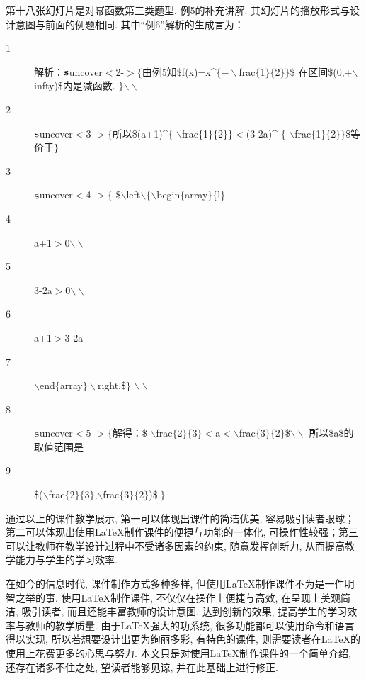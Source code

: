 第十八张幻灯片是对幂函数第三类题型, 例5的补充讲解. 其幻灯片的播放形式与设计意图与前面的例题相同. 其中“例6”解析的生成言为：
\begin{description}
	\item[1] 解析：${\mathbf s}$uncover$<$2-$>\{$由例5知\$f(x)=x\^{}$\{-\backslash$frac$\{$1$\}\{$2$\}\}$\$
	在区间\$(0,+$\backslash$infty)\$内是减函数. $\}$$\backslash\backslash$
	\item[2]${\mathbf s}$uncover$<$3-$>\{$所以\$(a+1)\^{}$\{$-$\backslash$frac$\{$1$\}\{$2$\}\}<$(3-2a)\^{}
	$\{$-$\backslash$frac$\{$1$\}\{$2$\}\}$\$等价于$\}$
	\item[3]${\mathbf s}$uncover$<$4-$>\{$ \$$\backslash$left$\backslash\{\backslash$begin$\{$array$\}\{$l$\}$
	\item[4]  a+1$>$0$\backslash\backslash$
	\item[5] 3-2a$>$0$\backslash\backslash$
	\item[6] a+1$>$3-2a
	\item[7] $\backslash$end$\{$array$\}\backslash$right.\$$\}$ $\backslash\backslash$
	\item[8]${\mathbf s}$uncover$<$5-$>\{$解得：\$
	$\backslash$frac$\{$2$\}\{$3$\}<$a$<\backslash$frac$\{$3$\}\{$2$\}$\$$\backslash\backslash$
	所以\$a\$的取值范围是
	\item[9] \$($\backslash$frac$\{$2$\}\{$3$\}$,$\backslash$frac$\{$3$\}\{$2$\}$)\$.$\}$
\end{description}


通过以上的课件教学展示, 第一可以体现出课件的简洁优美, 容易吸引读者眼球；第二可以体现出使用\LaTeX{}制作课件的便捷与功能的一体化, 可操作性较强；第三可以让教师在教学设计过程中不受诸多因素的约束, 随意发挥创新力, 从而提高教学能力与学生的学习效率.


在如今的信息时代, 课件制作方式多种多样, 但使用\LaTeX{}制作课件不为是一件明智之举的事. 使用\LaTeX{}制作课件, 不仅仅在操作上便捷与高效, 在呈现上美观简洁, 吸引读者, 而且还能丰富教师的设计意图, 达到创新的效果, 提高学生的学习效率与教师的教学质量. 由于\LaTeX{}强大的功系统, 很多功能都可以使用命令和语言得以实现, 所以若想要设计出更为绚丽多彩, 有特色的课件, 则需要读者在\LaTeX{}的使用上花费更多的心思与努力. 本文只是对使用\LaTeX{}制作课件的一个简单介绍, 还存在诸多不住之处, 望读者能够见谅, 并在此基础上进行修正.
